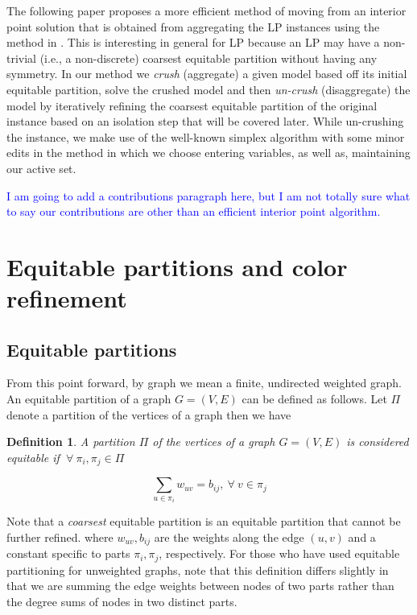 \documentclass[runningheads]{llncs}
\newcommand{\comment}[1]{\textcolor{blue}{#1}}
\newtheorem{defn}{Definition}
\numberwithin{defn}{section} %
\begin{document}
The following paper proposes a more efficient method of moving from an interior point solution that is obtained from aggregating the LP instances using the method in \cite{grohe2014dimension}.  This is interesting in general for LP because an LP may have a non-trivial (i.e., a non-discrete) coarsest equitable partition without having any symmetry.  In our method we \textit{crush} (aggregate) a given model based off its initial equitable partition, solve the crushed model and then \textit{un-crush} (disaggregate) the model by iteratively refining the coarsest equitable partition of the original instance based on an isolation step that will be covered later.  While un-crushing the instance, we make use of the well-known simplex algorithm with some minor edits in the method in which we choose entering variables, as well as, maintaining our active set.

\comment{I am going to add a contributions paragraph here, but I am not totally sure what to say our contributions are other than an efficient interior point algorithm.} 


\section{Equitable partitions and color refinement}
\subsection{Equitable partitions}
From this point forward, by graph we mean a finite, undirected weighted graph.  An equitable partition of a graph $G = (V, E)$ can be defined as follows.  Let $\Pi$ denote a partition of the vertices of a graph then we have

\begin{defn}
	A partition $\Pi$ of the vertices of a graph $G = (V, E)$ is considered equitable if $\ \forall \ \pi_i, \pi_j \in \Pi$
	
	\begin{equation}
	\label{eqpart}
		\sum_{u \in \pi_i} w_{uv} = b_{ij}, \ \forall \ v \in \pi_j
	\end{equation}
	
\end{defn}

\noindent
Note that a \textit{coarsest} equitable partition is an equitable partition that cannot be further refined.  where $w_{uv}, b_{ij}$ are the weights along the edge $(u,v)$ and a constant specific to parts $\pi_i, \pi_j$, respectively.  For those who have used equitable partitioning for unweighted graphs, note that this definition differs slightly in that we are summing the edge weights between nodes of two parts rather than the degree sums of nodes in two distinct parts.  
\end{document}
